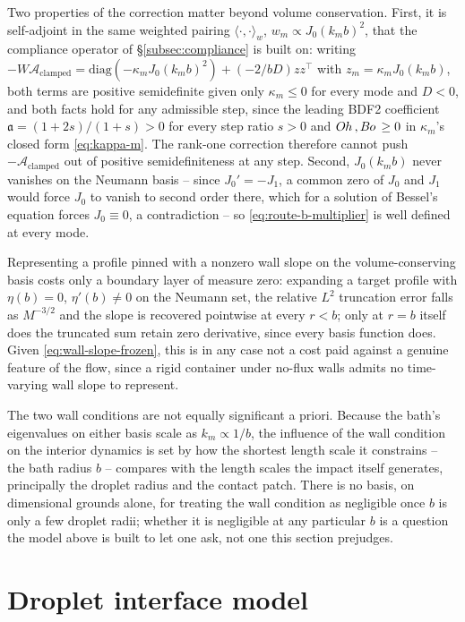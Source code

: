 Two properties of the correction matter beyond volume conservation. First, it is self-adjoint in the same weighted pairing $\langle\cdot,\cdot\rangle_w$, $w_m\propto J_0(k_mb)^2$, that the compliance operator of \S\ref{subsec:compliance} is built on: writing $-W\mathcal A_{\text{clamped}}=\mathrm{diag}(-\kappa_mJ_0(k_mb)^2)+(-2/bD)zz^\top$ with $z_m=\kappa_mJ_0(k_mb)$, both terms are positive semidefinite given only $\kappa_m\le0$ for every mode and $D<0$, and both facts hold for any admissible step, since the leading BDF2 coefficient $\mathfrak a=(1+2s)/(1+s)>0$ for every step ratio $s>0$ and $O\kern-0.04em h\,,B\kern-0.04em o\,\ge0$ in $\kappa_m$'s closed form \eqref{eq:kappa-m}. The rank-one correction therefore cannot push $-\mathcal A_{\text{clamped}}$ out of positive semidefiniteness at any step. Second, $J_0(k_mb)$ never vanishes on the Neumann basis -- since $J_0'=-J_1$, a common zero of $J_0$ and $J_1$ would force $J_0$ to vanish to second order there, which for a solution of Bessel's equation forces $J_0\equiv0$, a contradiction -- so \eqref{eq:route-b-multiplier} is well defined at every mode.

Representing a profile pinned with a nonzero wall slope on the volume-conserving basis costs only a boundary layer of measure zero: expanding a target profile with $\eta(b)=0$, $\eta'(b)\ne0$ on the Neumann set, the relative $L^2$ truncation error falls as $M^{-3/2}$ and the slope is recovered pointwise at every $r<b$; only at $r=b$ itself does the truncated sum retain zero derivative, since every basis function does. Given \eqref{eq:wall-slope-frozen}, this is in any case not a cost paid against a genuine feature of the flow, since a rigid container under no-flux walls admits no time-varying wall slope to represent.

The two wall conditions are not equally significant a priori. Because the bath's eigenvalues on either basis scale as $k_m\propto1/b$, the influence of the wall condition on the interior dynamics is set by how the shortest length scale it constrains -- the bath radius $b$ -- compares with the length scales the impact itself generates, principally the droplet radius and the contact patch. There is no basis, on dimensional grounds alone, for treating the wall condition as negligible once $b$ is only a few droplet radii; whether it is negligible at any particular $b$ is a question the model above is built to let one ask, not one this section prejudges.

\section{Droplet interface model}
\label{sec:drop}

